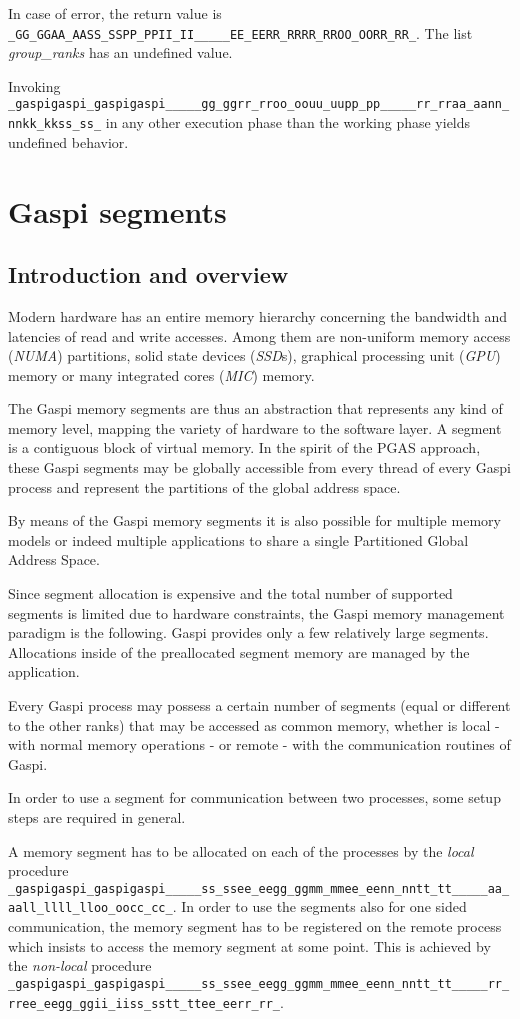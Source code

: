 \documentclass{article}
\makeatletter
\newlength{\st}\setlength{\st}{0pt}
\newcommand{\zerowsep}{\hskip 0pt plus 0.1pt minus 0.1pt}
\newcommand{\ZSEP}[1]{\ifx#1\@@@EOZ@@@\let\next\relax\else\ifx#1\_#1\zerowsep\else#1\fi\let\next\ZSEP\fi\next}
\newcommand{\zsep}[1]{\ZSEP{}#1\@@@EOZ@@@}
\newcommand{\gaspiprefix}{gaspi}
\newcommand{\GASPI}{{\sc Gaspi}}
\newcommand{\function}[1]{{\tt #1}}
\newcommand{\parameter}[1]{{\it #1}}
\newcommand{\gaspifunction}[1]{\function{\protect\zsep{\gaspiprefix\_#1}}}
\newcommand{\GASPIGERR}{{\tt\protect\zsep{GASPI\_ERROR}}}
\newcommand{\gaspisemantic}[1]{{\emph{#1}}}
\makeatother
\begin{document}
In case of error, the return value is \GASPIGERR{}. The list
\parameter{group\_ranks} has an undefined value.

Invoking
\gaspifunction{group\_ranks} in any other execution phase than the working phase
yields undefined behavior.


\section{\GASPI{} segments}

\subsection{Introduction and overview}

Modern hardware has an entire memory hierarchy concerning the
bandwidth and latencies of read and write accesses. Among them are
non-uniform memory access (\emph{NUMA}) partitions, solid state
devices (\emph{SSD}s), graphical processing unit (\emph{GPU}) memory
or many integrated cores (\emph{MIC}) memory.

The \GASPI{} memory segments are thus an abstraction that represents
any kind of memory level, mapping the variety of hardware to the
software layer. A segment is a contiguous block of virtual memory.
In the spirit of the PGAS approach, these \GASPI{}
segments may be globally accessible from every thread of every \GASPI{}
process and represent the partitions of the global address space.

By means of the \GASPI{} memory segments it is also possible for multiple 
memory models or indeed multiple applications to share a single Partitioned Global
Address Space.

Since segment allocation is expensive and the total number of supported
segments is limited due to hardware constraints, the \GASPI{} memory
management paradigm is the following.
\GASPI{} provides only a few relatively large segments.
Allocations inside of the preallocated segment memory are managed
by the application.

Every \GASPI{} process may possess a certain number of segments (equal or
different to the other ranks) that may be accessed as common memory,
whether is local - with normal memory operations - or remote - with
the communication routines of \GASPI{}.

In order to use a segment for communication between two processes,
some setup steps are required in general.

A memory segment has to be allocated on each of the processes
by the \gaspisemantic{local} procedure \gaspifunction{segment\_alloc}.
In order to use the segments also for one sided communication, the memory segment
has to be registered on the remote process which insists to
access the memory segment at some point. This is achieved by the
\gaspisemantic{non-local} procedure \gaspifunction{segment\_register}.
\end{document}
